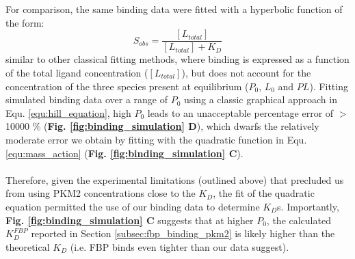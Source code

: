 %
%
\\\\
%
%
For comparison, the same binding data were fitted with a hyperbolic function of the form:
%
%
\begin{equation}
S_{obs} = \frac{[L_{total}]}{[L_{total}] + K_{D}}
\label{equ:hill_equation}
\end{equation}
%
%
similar to other classical fitting methods, where binding is expressed as a function of the total ligand concentration ($[L_{total}]$), but does not account for the concentration of the three species present at equilibrium ($P_0$, $L_0$ and $PL$). Fitting simulated binding data over a range of $P_0$ using a classic graphical approach in Equ. \ref{equ:hill_equation}, high $P_0$ leads to an unacceptable percentage error of $>$ 10000 \% (\textbf{Fig. \ref{fig:binding_simulation} D}), which dwarfs the relatively moderate error we obtain by fitting with the quadratic function in Equ. \ref{equ:mass_action} (\textbf{Fig. \ref{fig:binding_simulation} C}). 
%
%
\\\\
%
%
Therefore, given the experimental limitations (outlined above) that precluded us from using PKM2 concentrations close to the $K_D$, the fit of the quadratic equation permitted the use of our binding data to determine $K_D$s. Importantly, \textbf{Fig. \ref{fig:binding_simulation} C} suggests that at higher $P_0$, the calculated $K_{D}^{FBP}$ reported in Section \ref{subsec:fbp_binding_pkm2} is likely higher than the theoretical $K_D$ (i.e. FBP binds even tighter than our data suggest). 
%
%
%
